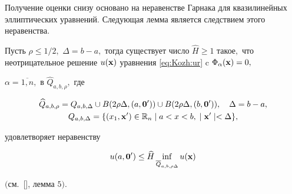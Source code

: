 \smallskip





Получение оценки снизу основано на неравенстве Гарнака \cite{KozhKhad:bib:Serrin} для квазилинейных эллиптических уравнений. Следующая лемма является следствием этого неравенства.



\begin{lemma}[1]Пусть $\rho\leq 1/2,$ $\Delta=b-a,$ тогда существует число $\widehat{H}\geq 1$ такое$,$ что неотрицательное решение $u({\bf x})$ уравнения \eqref{eq:Kozh:ur} c $\Phi_\alpha({\bf x})=0,$

$\alpha=\overline{1,n},$ в $\widehat{Q}_{a,b,\rho},$ где

\begin{gather*}

\widehat{Q}_{a,b,\rho}=Q_{a,b,\Delta}\cup B(2\rho\Delta,(a,{\bf

0}'))\cup B(2\rho\Delta,(b,{\bf 0}')),\quad \Delta=b-a,\\

Q_{a,b,\Delta}=\{(x_1,{\bf x}')\in\mathbb{R}_{n} \mid

a<x<b,\;\mid {\bf x}'\mid <\Delta\},

\end{gather*}

удовлетворяет неравенству

$$

u(a,{\bf 0}')\leq \widehat{H}\inf

\limits_{\overline{Q}_{a,b,\rho\Delta}}u({\bf x})

$$

$($см.~{\rm [],} лемма $5).$

\end{lemma}



\smallskip



